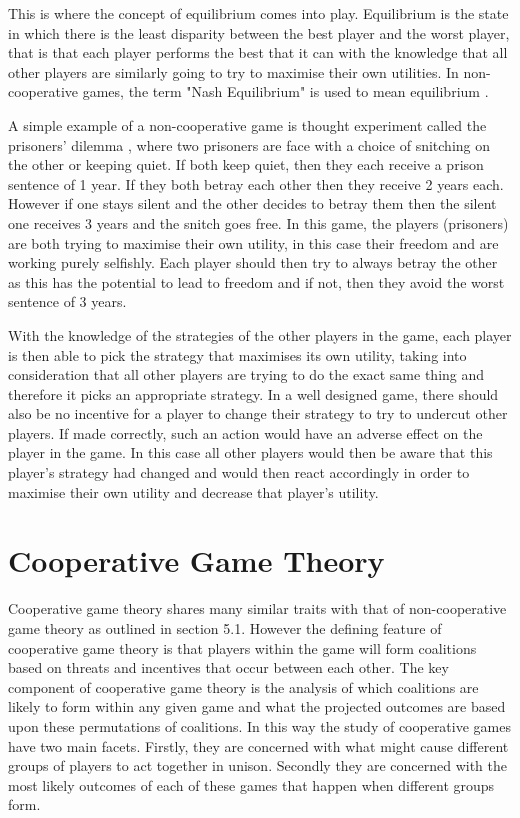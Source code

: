 \documentclass[a4paper, notitlepage]{report}
\begin{document}
This is where the concept of equilibrium comes into play. Equilibrium is the
state in which there is the least disparity between the best player and the
worst player, that is that each player performs the best that it can with the
knowledge that all other players are similarly going to try to maximise their
own utilities. In non-cooperative games, the term "Nash Equilibrium" is used to
mean equilibrium \cite{cournot1960researches}.

A simple example of a non-cooperative game is thought experiment called the
prisoners' dilemma \cite{poundstone1993prisoner}, where two prisoners are face
with a choice of snitching on the other or keeping quiet. If both keep quiet,
then they each receive a prison sentence of 1 year. If they both betray each other
then they receive 2 years each. However if one stays silent and the other
decides to betray them then the silent one receives 3 years and the snitch goes
free. In this game, the players (prisoners) are both trying to maximise their
own utility, in this case their freedom and are working purely selfishly. Each
player should then try to always betray the other as this has the potential to
lead to freedom and if not, then they avoid the worst sentence of 3 years. 

With the knowledge of the strategies of the other players in the game, each
player is then able to pick the strategy that maximises its own utility, taking
into consideration that all other players are trying to do the exact same thing
and therefore it picks an appropriate strategy. In a well designed game, there
should also be no incentive for a player to change their strategy to try to
undercut other players. If made correctly, such an action would have an adverse
effect on the player in the game. In this case all other players would then be
aware that this player’s strategy had changed and would then react accordingly
in order to maximise their own utility and decrease that player’s utility.
\section{Cooperative Game Theory}
\label{sec:orgcad6d10}
Cooperative game theory shares many similar traits with that of non-cooperative
game theory as outlined in section 5.1. However the defining feature of
cooperative game theory is that players within the game will form coalitions
based on threats and incentives that occur between each other. The key component
of cooperative game theory is the analysis of which coalitions are likely to
form within any given game and what the projected outcomes are based upon these
permutations of coalitions. In this way the study of cooperative games have two
main facets. Firstly, they are concerned with what might cause different groups
of players to act together in unison. Secondly they are concerned with the most
likely outcomes of each of these games that happen when different groups form.
\end{document}

